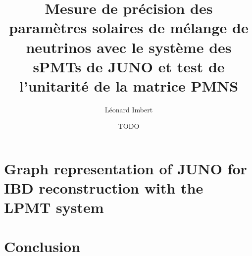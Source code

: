 \documentclass[
10pt, %
english, %
onehalfspacing, %
nolistspacing, %
toctotoc, %
parskip, %
headsepline, %
]{MastersDoctoralThesis} %
\title{Mesure de précision des paramètres solaires de mélange de neutrinos avec le système des sPMTs de JUNO et test de l'unitarité de la matrice PMNS}
\author{Léonard Imbert}
\date{TODO}
\begin{document}





\newcommand*{\bnue}{\ensuremath{\bar{\nu}_{e}}}


\frontmatter %

\pagestyle{plain} %


\mainmatter


\tableofcontents

\pagestyle{thesis}
\singlespacing








%





\chapter{Graph representation of JUNO for IBD reconstruction with the LPMT system}
\label{sec:jgnn}





\chapter{Conclusion}

\cleardoublepage

\appendix



\listoftables {}
\end{document}
